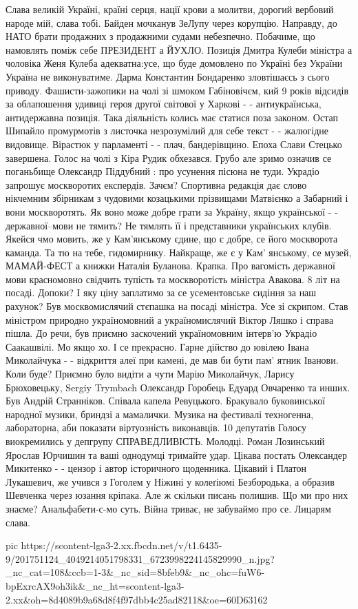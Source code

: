 Слава великій Україні, країні серця, нації крови а молитви, дорогий вербовий
народе мій, слава тобі. Байден мочканув ЗеЛупу через корупцію. Направду, до
НАТО брати продажних з продажними судами небезпечно. Побачиме, що намовлять
поміж себе ПРЕЗИДЕНТ а ЙУХЛО. Позиція Дмитра Кулеби міністра а чоловіка Женя
Кулеба адекватна:усе, що буде домовлено по Україні без України Україна не
виконуватиме. Дарма Константин Бондаренко зловтішаєсь з сього приводу.
Фашисти-зажопики на чолі зі шмоком Габіновічєм, кий 9 років відсидів за
облапошення удивиці героя другої світової у Харкові - - антиукраїнська,
антидержавна позиція. Така діяльність колись має статися поза законом. Остап
Шипайло промурмотів з  листочка незрозумілий для себе текст - - жалюгідне
видовище. Вірастюк у парламенті - - плач, бандерівщино. Епоха Слави Стецько
завершена. Голос на чолі з Кіра Рудик обхезався. Грубо але зримо означив се
поганьбище Олександр Піддубний : про усунення пісюна не туди. Украдіо запрошує
москворотих експердів. Зачєм? Спортивна редакція дає слово нікчемним збірникам
з чудовими козацькими прізвищами Матвієнко а Забарний і вони москворотять. Як
воно може добре грати за Україну, якщо української - - державної--мови не
тямить? Не тямлять її і представники українських клубів. Якейся чмо мовить, же
у Кам'янському єдине, що є добре, се його москворота каманда. Та тю на тебе,
гидомирнику. Найкраще, же є у Кам' янському, се музей, МАМАЙ-ФЕСТ а книжки
Наталія Буланова. Крапка. Про вагомість державної мови красномовно свідчить
тупість та москворотість міністра Авакова. 8 літ на посаді. Допоки? І яку ціну
заплатимо за се усементовське сидіння за наш рахунок? Був москвомислячий
стєпашка на посаді міністра. Усе зі скрипом. Став міністром природно
україномовний а україномислячий Віктор Ляшко  і справа пішла. До речи, був
приємно заскочений україномовним інтерв'ю Украдіо Саакашвілі. Мо якщо хо. І се
прекрасно. Гарне дійство до ювілею Івана Миколайчука - - відкриття алеї при
камені, де мав би бути пам' ятник Іванови. Коли буде? Приємно було видіти а
чути Марію Миколайчук, Ларису Брюховецьку, Sergiy Trymbach Олександр Горобець
Едуард Овчаренко та инших. Був Андрій Странніков. Співала капела Ревуцького.
Бракувало буковинської народної музики, бриндзі а мамалички. Музика на
фестивалі техногенна, лабораторна, аби показати віртуозність виконавців. 10
депутатів Голосу виокремились у депгрупу СПРАВЕДЛИВІСТЬ. Молодці. Роман
Лозинський Ярослав Юрчишин та ваші однодумці тримайте удар. Цікава постать
Олександер Микитенко - - цензор і автор історичного щоденника. Цікавий і Платон
Лукашевич, же учився з Гоголем у Ніжині у колеґіюмі Безбородька, а образив
Шевченка через юзання кріпака. Але ж скільки писань полишив. Що ми про них
знаєме? Анальфабети-с-мо суть. Війна триває, не забуваймо про се. Лицарям
слава.

\ifcmt
  pic https://scontent-lga3-2.xx.fbcdn.net/v/t1.6435-9/201751124_4049214051798331_6723998224145829990_n.jpg?_nc_cat=108&ccb=1-3&_nc_sid=8bfeb9&_nc_ohc=fuW6-bpExrcAX9oh3ik&_nc_ht=scontent-lga3-2.xx&oh=8d4089b9a68d8f4f97dbb4c25ad82118&oe=60D63162
\fi
